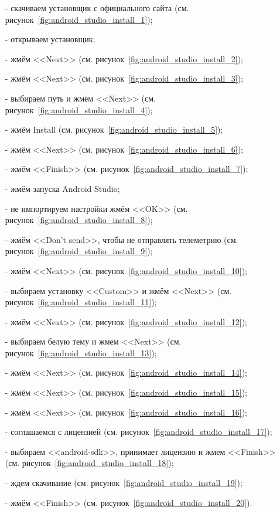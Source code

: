 \begin{itemize}
    \item[-] скачиваем установщик с официального сайта (см. рисунок~\ref{fig:android_studio_install_1});
    \item[-] открываем установщик;
    \item[-] жмём <<Next>> (см. рисунок~\ref{fig:android_studio_install_2});
    \item[-] жмём <<Next>> (см. рисунок~\ref{fig:android_studio_install_3});
    \item[-] выбираем путь и жмём <<Next>> (см. рисунок~\ref{fig:android_studio_install_4});
    \item[-] жмём Install (см. рисунок~\ref{fig:android_studio_install_5});
    \item[-] жмём <<Next>> (см. рисунок~\ref{fig:android_studio_install_6});
    \item[-] жмём <<Finish>> (см. рисунок~\ref{fig:android_studio_install_7});
    \item[-] жмём запуска Android Studio;
    \item[-] не импортируем настройки жмём <<OK>> (см. рисунок~\ref{fig:android_studio_install_8});
    \item[-] жмём <<Don't send>>, чтобы не отправлять телеметрию (см. рисунок~\ref{fig:android_studio_install_9});
    \item[-] жмём <<Next>> (см. рисунок~\ref{fig:android_studio_install_10});
    \item[-] выбираем установку <<Custom>> и жмём <<Next>> (см. рисунок~\ref{fig:android_studio_install_11});
    \item[-] жмём <<Next>> (см. рисунок~\ref{fig:android_studio_install_12});
    \item[-] выбираем белую тему и жмем <<Next>> (см. рисунок~\ref{fig:android_studio_install_13});
    \item[-] жмём <<Next>> (см. рисунок~\ref{fig:android_studio_install_14});
    \item[-] жмём <<Next>> (см. рисунок~\ref{fig:android_studio_install_15});
    \item[-] жмём <<Next>> (см. рисунок~\ref{fig:android_studio_install_16});
    \item[-] соглашаемся с лицензией (см. рисунок~\ref{fig:android_studio_install_17});
    \item[-] выбираем <<android-sdk>>, принимает лицензию и жмем <<Finish>> (см. рисунок~\ref{fig:android_studio_install_18});
    \item[-] ждем скачивание (см. рисунок~\ref{fig:android_studio_install_19});
    \item[-] жмём <<Finish>> (см. рисунок~\ref{fig:android_studio_install_20}).
\end{itemize}

